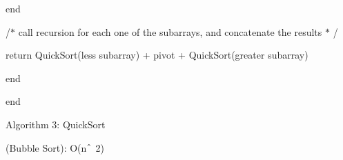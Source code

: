 \documentclass[12pt]{article}
\begin{document}
\begin{adjustwidth}{0.77in}{0.0in}
{\fontsize{11pt}{13.2pt}\selectfont end\par}\par

\end{adjustwidth}

\begin{adjustwidth}{0.77in}{0.0in}
{\fontsize{11pt}{13.2pt}\selectfont /$\ast$  call recursion for each one of the subarrays, and concatenate the results  $\ast$ /\par}\par

\end{adjustwidth}

\begin{adjustwidth}{0.77in}{0.0in}
{\fontsize{11pt}{13.2pt}\selectfont return QuickSort(less  subarray) + pivot + QuickSort(greater subarray)\par}\par

\end{adjustwidth}

\begin{adjustwidth}{0.54in}{0.0in}
{\fontsize{11pt}{13.2pt}\selectfont end\par}\par

\end{adjustwidth}

\begin{adjustwidth}{0.31in}{6.61in}
\begin{justify}
{\fontsize{11pt}{13.2pt}\selectfont end\par}
\end{justify}\par

\end{adjustwidth}

\begin{adjustwidth}{2.67in}{2.79in}
\begin{Center}
{\fontsize{11pt}{13.2pt}\selectfont Algorithm 3: QuickSort\par}
\end{Center}\par

\end{adjustwidth}


\vspace{\baselineskip}

\vspace{\baselineskip}
\begin{adjustwidth}{2.67in}{2.79in}
\begin{Center}
{\fontsize{11pt}{13.2pt}\selectfont (Bubble Sort): O(n$ \string^ $ 2)\par}
\end{Center}\par

\end{adjustwidth}
\end{document}
